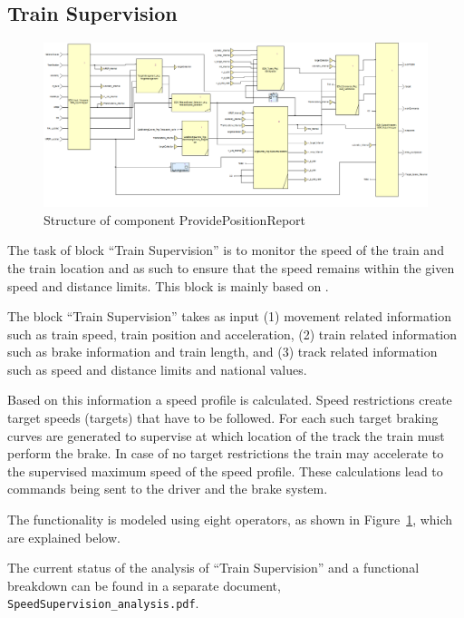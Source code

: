 \subsection{Train Supervision}

\begin{figure}[!h]
\centering
\includegraphics[width=0.95\textheight, angle=90]{../images/speedsupervision.png}
\caption{Structure of component ProvidePositionReport}\label{fig:ssv}
\end{figure}

The task of block ``Train Supervision'' is to monitor the speed of the train and the train location and as such to ensure that the speed remains within the given speed and distance limits. This block is mainly based on \cite[Chapt.~3.13]{subset-026}.

The block ``Train Supervision'' takes as input (1) movement related information such as train speed, train position and acceleration, (2) train related information such as brake information and train length, and (3) track related information such as speed and distance limits and national values.

Based on this information a speed profile is calculated. Speed restrictions create target speeds (targets) that have to be followed. For each such target braking curves are generated to supervise at which location of the track the train must perform the brake. In case of no target restrictions the train may accelerate to the supervised maximum speed of the speed profile. These calculations lead to commands being sent to the driver and the brake system.

The functionality is modeled using eight operators, as shown in Figure~\ref{fig:ssv}, which are explained below.

The current status of the analysis of ``Train Supervision'' and a functional breakdown can be found in a separate document, \verb+SpeedSupervision_analysis.pdf+.



